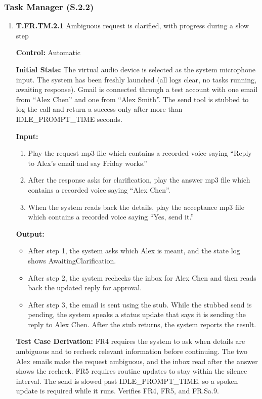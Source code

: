 \documentclass[12pt, titlepage]{article}
\begin{document}
\subsubsection{Task Manager (S.2.2)}

\begin{enumerate}
\item{\textbf{T.FR.TM.2.1} Ambiguous request is clarified, with progress during a slow step\\}\label{test:T.FR.TM.2.1}

\textbf{Control:} Automatic

\textbf{Initial State:}
The virtual audio device is selected as the system microphone input.  The system has been freshly launched (all logs clear, no tasks running, awaiting response).
Gmail is connected through a test account with one email from ``Alex Chen'' and one from ``Alex Smith''. 
The send tool is stubbed to log the call and return a success only after more than \textsc{IDLE\_PROMPT\_TIME} seconds.

\textbf{Input:}
\begin{enumerate}
  \item Play the request mp3 file which contains a recorded voice saying ``Reply to Alex's email and say Friday works.''
  \item After the response asks for clarification, play the answer mp3 file which contains a recorded voice saying ``Alex Chen''.
  \item When the system reads back the details, play the acceptance mp3 file which contains a recorded voice saying ``Yes, send it.''
\end{enumerate}

\textbf{Output:}
\begin{itemize}
  \item After step 1, the system asks which Alex is meant, and the state log shows AwaitingClarification.
  \item After step 2, the system rechecks the inbox for Alex Chen and then reads back the updated reply for approval.
  \item After step 3, the email is sent using the stub. While the stubbed send is pending, the system speaks a status update that says it is sending 
  the reply to Alex Chen. After the stub returns, the system reports the result.
\end{itemize}

\textbf{Test Case Derivation:} FR4 requires the system to ask when details are ambiguous and to recheck relevant information before continuing. 
The two Alex emails make the request ambiguous, and the inbox read after the answer shows the recheck. 
FR5 requires routine updates to stay within the silence interval. The send is slowed past \textsc{IDLE\_PROMPT\_TIME}, so a spoken update is
 required while it runs. Verifies FR4, FR5, and FR.Sa.9.


\end{enumerate}
\end{document}
